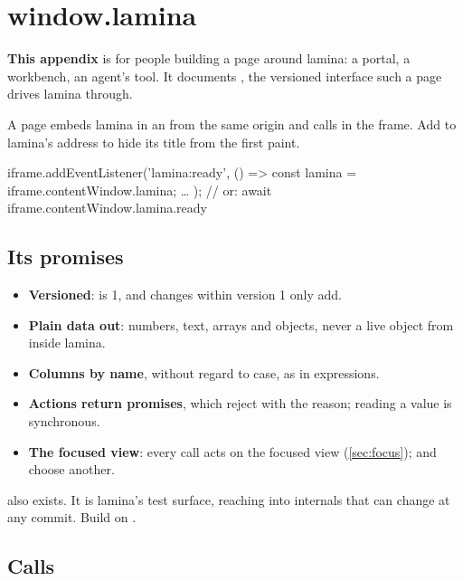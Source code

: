 \chapter{window.lamina}\label{app:host}
\begin{goals}
\textbf{This appendix} is for people building a page around lamina: a portal, a workbench, an agent's
tool. It documents , the versioned interface such a page drives lamina through.
\end{goals}

A page embeds lamina in an  from the same origin and calls  in the
frame. Add  to lamina's address to hide its title from the first paint.

\begin{codeblock}
iframe.addEventListener('lamina:ready', () => {
  const lamina = iframe.contentWindow.lamina;
  …
});
// or: await iframe.contentWindow.lamina.ready
\end{codeblock}

\section{Its promises}

\begin{itemize}
\item \textbf{Versioned}:  is 1, and changes within version 1 only add.
\item \textbf{Plain data out}: numbers, text, arrays and objects, never a live object from inside lamina.
\item \textbf{Columns by name}, without regard to case, as in expressions.
\item \textbf{Actions return promises}, which reject with the reason; reading a value is synchronous.
\item \textbf{The focused view}: every call acts on the focused view (\cref{sec:focus}); 
and  choose another.
\end{itemize}

 also exists. It is lamina's test surface, reaching into internals that can change
at any commit. Build on .

\section{Calls}

